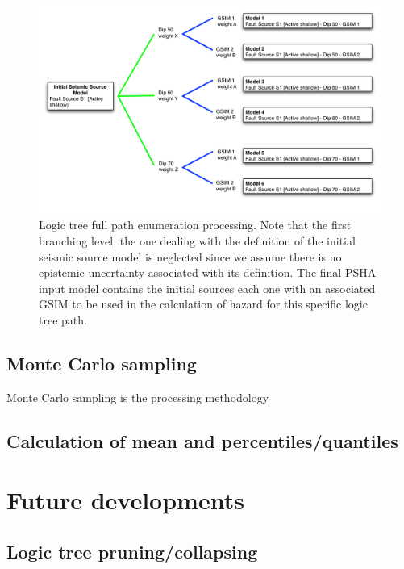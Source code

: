 %
\begin{figure}[ht]
\centering
\includegraphics[width=\textwidth]{./Pictures/lts/logic_tree_ex1.pdf}
\caption{Logic tree full path enumeration processing. Note that the
first branching level, the one dealing with the definition of the initial 
seismic source model is neglected since we assume there is no epistemic
uncertainty associated with its definition. The final PSHA input model 
contains the initial sources each one with an associated GSIM to be used 
in the calculation of hazard for this specific logic tree path.}
\label{fig:logic_tree_example1}
\end{figure}
%
%
\subsection{Monte Carlo sampling}
Monte Carlo sampling is the processing methodology 
%
\subsection{Calculation of mean and percentiles/quantiles}

%
\clearpage
\section{Future developments}
%
\subsection{Logic tree pruning/collapsing}
